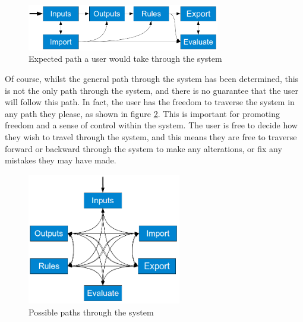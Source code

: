 \begin{figure}[ht!]
\begin{center}
\includegraphics[width=0.75\textwidth]{images/genericPathOne}
\end{center}
\caption{Expected path a user would take through the system}
\label{fig:pathThrough}
\end{figure}
\noindent 
Of course, whilst the general path through the system has been determined, this is not the only path through the system, and there is no guarantee that the user will follow this path. In fact, the user has the freedom to traverse the system in any path they please, as shown in figure \ref{fig:webThrough}. This is important for promoting freedom and a sense of control within the system. The user is free to decide how they wish to travel through the system, and this means they are free to traverse forward or backward through the system to make any alterations, or fix any mistakes they may have made.

\begin{figure}[ht!]
\begin{center}
\includegraphics[width=0.6\textwidth]{images/web}
\end{center}
\caption{Possible paths through the system}
\label{fig:webThrough}
\end{figure}

